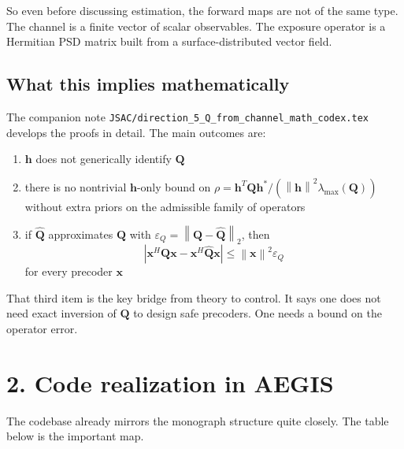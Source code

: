 \documentclass[11pt]{article}
\newcommand{\hh}{\mathbf{h}}
\newcommand{\QQ}{\mathbf{Q}}
\newcommand{\x}{\mathbf{x}}
\newcommand{\norm}[1]{\left\lVert #1 \right\rVert}
\newcommand{\abs}[1]{\left\lvert #1 \right\rvert}
\begin{document}
So even before discussing estimation, the forward maps are not of the same
type. The channel is a finite vector of scalar observables. The exposure
operator is a Hermitian PSD matrix built from a surface-distributed vector
field.

\subsection*{What this implies mathematically}

The companion note
\texttt{JSAC/direction\_5\_Q\_from\_channel\_math\_codex.tex} develops the
proofs in detail. The main outcomes are:
\begin{enumerate}
  \item $\hh$ does not generically identify $\QQ$
  \item there is no nontrivial $\hh$-only bound on
  $\rho = \hh^T\QQ\hh^*/(\norm{\hh}^2\lambda_{\max}(\QQ))$ without extra
  priors on the admissible family of operators
  \item if $\widehat{\QQ}$ approximates $\QQ$ with
  $\varepsilon_Q = \norm{\QQ-\widehat{\QQ}}_2$, then
  \begin{equation}
    \abs{\x^H\QQ\x-\x^H\widehat{\QQ}\x} \le \norm{\x}^2 \varepsilon_Q
  \end{equation}
  for every precoder $\x$
\end{enumerate}

That third item is the key bridge from theory to control. It says one does
not need exact inversion of $\QQ$ to design safe precoders. One needs a bound
on the operator error.

\section*{2. Code realization in AEGIS}

The codebase already mirrors the monograph structure quite closely. The table
below is the important map.
\end{document}
